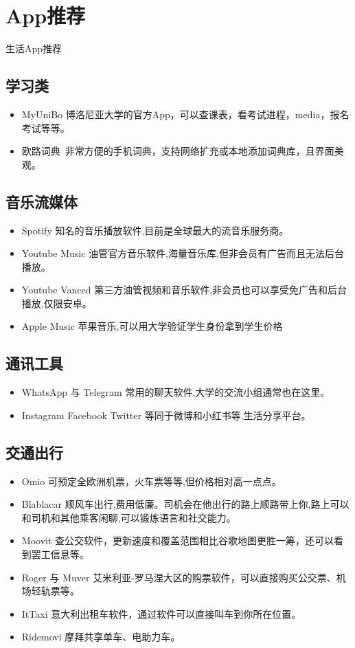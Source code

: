 \section{App推荐}
生活App推荐

\subsection{学习类}
\begin{itemize}
\item MyUniBo  博洛尼亚大学的官方App，可以查课表，看考试进程，media，报名考试等等。
\item 欧路词典\ 非常方便的手机词典，支持网络扩充或本地添加词典库，且界面美观。
\end{itemize}

\subsection{音乐流媒体}
\begin{itemize}
\item Spotify  知名的音乐播放软件,目前是全球最大的流音乐服务商。
\item Youtube Music  油管官方音乐软件,海量音乐库,但非会员有广告而且无法后台播放。
\item Youtube Vanced 第三方油管视频和音乐软件,非会员也可以享受免广告和后台播放,仅限安卓。
\item Apple Music 苹果音乐,可以用大学验证学生身份拿到学生价格
\end{itemize}

\subsection{通讯工具}
\begin{itemize}
\item WhatsApp 与 Telegram 常用的聊天软件,大学的交流小组通常也在这里。
\item Instagram  Facebook Twitter 等同于微博和小红书等,生活分享平台。
\end{itemize}

\subsection{交通出行}
\begin{itemize}
\item Omio  可预定全欧洲机票，火车票等等,但价格相对高一点点。 
\item Blablacar 顺风车出行,费用低廉。司机会在他出行的路上顺路带上你,路上可以和司机和其他乘客闲聊,可以锻炼语言和社交能力。
\item Moovit  查公交软件，更新速度和覆盖范围相比谷歌地图更胜一筹，还可以看到罢工信息等。
\item Roger 与 Muver  艾米利亚-罗马涅大区的购票软件，可以直接购买公交票、机场轻轨票等。
\item ItTaxi  意大利出租车软件，通过软件可以直接叫车到你所在位置。
\item Ridemovi  摩拜共享单车、电助力车。
\end{itemize}

